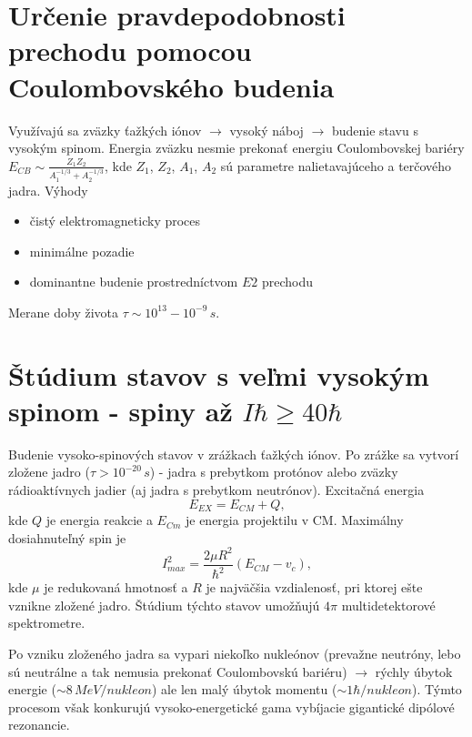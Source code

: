 \documentclass[../../main.tex]{subfiles}
\begin{document}
\section{Určenie pravdepodobnosti prechodu pomocou Coulombovského budenia}
Využívajú sa zväzky ťažkých iónov $\rightarrow$ vysoký náboj $\rightarrow$ budenie stavu s vysokým spinom. Energia zväzku nesmie prekonať energiu Coulombovskej bariéry $E_{CB} \sim \frac{Z_1Z_2}{A_1^{-1/3}+A_2^{-1/3}}$, kde $Z_1$, $Z_2$, $A_1$, $A_2$ sú parametre nalietavajúceho a terčového jadra. Výhody
\begin{itemize}
	\item čistý elektromagneticky proces
	\item minimálne pozadie
	\item dominantne budenie prostredníctvom $E2$ prechodu 
\end{itemize}
Merane doby života $\tau \sim 10^{13}-10^{-9}\,s$.
\section{Štúdium stavov s veľmi vysokým spinom - spiny až $ I\hbar \geq 40\hbar$}
Budenie vysoko-spinových stavov v zrážkach ťažkých iónov. Po zrážke sa vytvorí zložene jadro ($\tau > 10^{-20}\,s$) - jadra s prebytkom protónov alebo zväzky rádioaktívnych jadier (aj jadra s prebytkom neutrónov).
Excitačná energia 
$$E_{EX}=E_{CM}+Q,$$ 
kde $Q$ je energia reakcie a $E_{Cm}$ je energia projektilu v CM. Maximálny dosiahnuteľný spin je 
$$I^2_{max}=\frac{2\mu R^2}{\hbar^2}(E_{CM}-v_c),$$
kde $\mu$ je redukovaná hmotnosť a $R$ je najväčšia vzdialenosť, pri ktorej ešte vznikne zložené jadro. Štúdium týchto stavov umožňujú $4\pi$ multidetektorové spektrometre.

Po vzniku zloženého jadra sa vypari niekoľko nukleónov (prevažne neutróny, lebo sú neutrálne a tak nemusia prekonať Coulombovskú bariéru) $\rightarrow$ rýchly úbytok energie ($\sim 8\,MeV/nukleon$) ale len malý úbytok momentu ($\sim 1 \hbar/nukleon$). Týmto procesom však konkurujú vysoko-energetické gama vybíjacie gigantické dipólové rezonancie.
\end{document}
